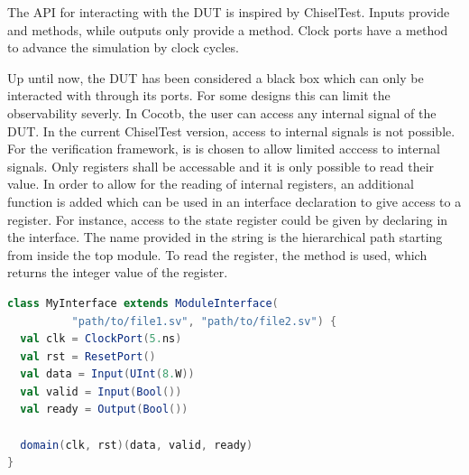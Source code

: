 The API for interacting with the DUT is inspired by ChiselTest. Inputs provide  and  methods,
while outputs only provide a  method. Clock ports have a  method to advance the simulation by
 clock cycles.



Up until now, the DUT has been considered a black box which can only be interacted with through its ports. For some designs this can limit the observability severly. In Cocotb, the user can access any internal signal of the DUT. In the current ChiselTest version, access to internal signals is not possible. For the verification framework, is is chosen to allow limited acccess to internal signals. Only registers shall be accessable and it is only possible to read their value. In order to allow for the reading of internal registers, an additional function is added which can be used in an interface declaration to give access to a register. For instance, access to the state register could be given by declaring  in the interface. The name provided in the string is the hierarchical path starting from inside the top module. To read the register, the  method is used, which returns the integer value of the register.


\begin{listing}
\begin{lstlisting}[language=scala, captionpos=b, caption=Example for an interface declaration in Scala. Each data signal is assocaited with a clock domain.,label=lst:interface]
class MyInterface extends ModuleInterface(
          "path/to/file1.sv", "path/to/file2.sv") {
  val clk = ClockPort(5.ns)
  val rst = ResetPort()
  val data = Input(UInt(8.W))
  val valid = Input(Bool())
  val ready = Output(Bool())

  domain(clk, rst)(data, valid, ready)
}
\end{lstlisting}
\end{listing}

